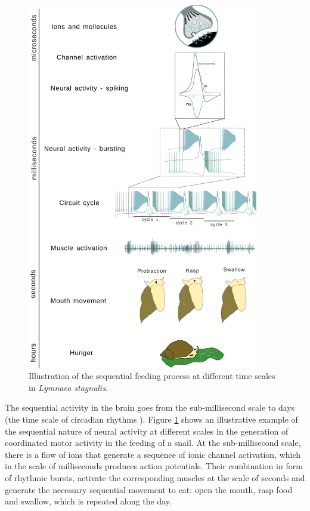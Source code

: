 \begin{figure}[hbt!]
	\centering
	\includegraphics[width=0.9\textwidth]{img/intro/time scale/time-scale-feeding.pdf}
	\caption{Illustration of the sequential feeding process at different time scales in {\sl Lymnaea stagnalis}.}
	\label{fig:time scale feeding}
\end{figure}

The sequential activity in the brain goes from the sub-millisecond scale to days (the time scale of circadian rhythms \parencite{mauk_neural_2004}). Figure \ref{fig:time scale feeding} shows an illustrative example of the sequential nature of neural activity at different scales in the generation of coordinated motor activity in the feeding of a snail. At the sub-millisecond scale, there is a flow of ions that generate a sequence of ionic channel activation, which in the scale of milliseconds produces action potentials. Their combination in form of rhythmic bursts, activate the corresponding muscles at the scale of seconds and generate the necessary sequential movement to eat: open the mouth, rasp food and swallow, which is repeated along the day. 


